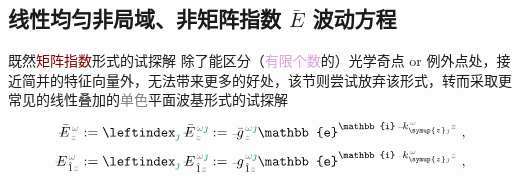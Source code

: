 \clearpage
\vspace*{-8.0em}


\subsection{线性均匀非局域、非矩阵指数 $\bar{E}$ 波动方程}\label{ssec:E-waveq-linear}

既然\textcolor{Maroon}{矩阵指数}形式的试探解  除了能区分（\textcolor{Plum}{有限个数}的）\textcolor{PineGreen}{光学奇点} or \textcolor{PineGreen}{例外点}处，接近简并的\textcolor{PineGreen}{特征向量}外，无法带来更多的好处，该节则尝试放弃该形式，转而采取更常见的\textcolor{PineGreen}{线性叠加}的\textcolor{gray}{单色}\textcolor{PineGreen}{平面波基}形式的试探解
\begin{subequations} \label{eq:plane_wave_basis}
\begin{align}
	\xint{\mathcolor{gray}{-}}{30}{\bar{E}}^{\;\!\mathcolor{gray}{\omega}}_{\;\! \mathcolor{gray}{z}} &:= \leftindex_{\textcolor{PineGreen}{\jmath}} \;\! \xint{\mathcolor{gray}{-}}{30}{\bar{E}}^{\;\!\mathcolor{gray}{\omega} \textcolor{PineGreen}{\jmath}}_{\;\! \mathcolor{gray}{z}} := \xint{{}^{}_{\mathcolor{gray}{-}}}{10}{\bar{g}}^{\;\!\mathcolor{gray}{\omega} \textcolor{PineGreen}{\jmath}}_{\;\! \mathcolor{gray}{z}} \mathbb{e}^{\mathbb{i} \xint{\begin{smallmatrix} ~ \\ {}^{}_{\mathcolor{gray}{-}} \\ ~ \end{smallmatrix}}{15}{k}_{\symup{z} \textcolor{PineGreen}{\jmath}}^{\;\! \mathcolor{gray}{\omega}} \mathcolor{gray}{z}} ~, \label{eq:vec-plane_wave_basis} \\
	\xint{\mathcolor{gray}{-}}{30}{E}^{\;\!\mathcolor{gray}{\omega}}_{\;\! \hat{1} \mathcolor{gray}{z}} &:= \leftindex_{\textcolor{PineGreen}{\jmath}} \;\! \xint{\mathcolor{gray}{-}}{30}{E}^{\;\!\mathcolor{gray}{\omega} \textcolor{PineGreen}{\jmath}}_{\;\! \hat{1} \mathcolor{gray}{z}} := \xint{{}^{}_{\mathcolor{gray}{-}}}{10}{g}^{\;\!\mathcolor{gray}{\omega} \textcolor{PineGreen}{\jmath}}_{\;\! \hat{1} \mathcolor{gray}{z}} \mathbb{e}^{\mathbb{i} \xint{\begin{smallmatrix} ~ \\ {}^{}_{\mathcolor{gray}{-}} \\ ~ \end{smallmatrix}}{15}{k}_{\symup{z} \textcolor{PineGreen}{\jmath}}^{\;\! \mathcolor{gray}{\omega}} \mathcolor{gray}{z}} ~, \label{eq:components-plane_wave_basis}
\end{align}
\end{subequations}
